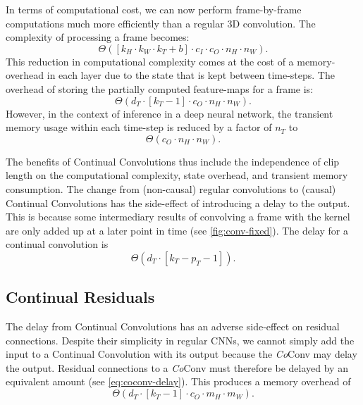 In terms of computational cost, we can now perform frame-by-frame computations much more efficiently than a regular 3D convolution. The complexity of processing a frame becomes:
\begin{equation}
    \Theta( [k_H \cdot k_W \cdot k_T + b] \cdot c_I \cdot c_O \cdot n_H \cdot n_W).
\end{equation}
This reduction in computational complexity comes at the cost of a memory-overhead in each layer due to the state that is kept between time-steps. 
The overhead of storing the partially computed feature-maps for a frame is:
\begin{equation}
    \Theta( d_T \cdot [k_T -1] \cdot c_O \cdot n_H \cdot n_W).
\end{equation}
However, in the context of inference in a deep neural network, the transient memory usage within each time-step is reduced by a factor of $n_T$ to
\begin{equation}
    \Theta(c_O \cdot n_H \cdot n_W).
\end{equation}

The benefits of Continual Convolutions thus include the independence of clip length on the computational complexity, state overhead, and transient memory consumption.
The change from (non-causal) regular convolutions to (causal) Continual Convolutions has the side-effect of introducing a delay to the output. 
This is because some intermediary results of convolving a frame with the kernel are only added up at a later point in time (see \cref{fig:conv-fixed}). 
The delay for a continual convolution is
%
\begin{equation}
    \Theta(d_T \cdot [k_T - p_T - 1]).
\label{eq:coconv-delay}
\end{equation}


\subsection{Continual Residuals} \label{sec:residual}
The delay from Continual Convolutions has an adverse side-effect on residual connections. 
Despite their simplicity in regular CNNs, we cannot simply add the input to a Continual Convolution with its output because the \textit{Co}Conv may delay the output.
Residual connections to a \textit{Co}Conv must therefore be delayed by an equivalent amount (see \cref{eq:coconv-delay}).
This produces a memory overhead of 
%
\begin{equation}
    \Theta( d_T \cdot [k_T -1] \cdot c_O \cdot m_H \cdot m_W).
\label{eq:residual-mem}
\end{equation}


